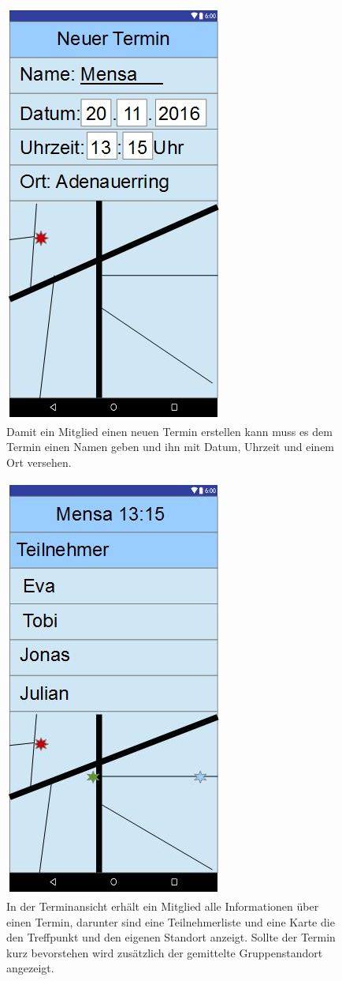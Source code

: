 \documentclass{scrartcl}
\begin{document}
	\newpage
	\begin{figure}[h]
	\centering
	\includegraphics[width=.5\textwidth]{GUI_NeuerTermin.jpg}
	\caption{Damit ein Mitglied einen neuen Termin erstellen kann muss es dem Termin einen Namen geben und ihn mit Datum, Uhrzeit und einem Ort versehen.}
 	\end{figure}

	\newpage
	\begin{figure}[h]
	\centering
	\includegraphics[width=.5\textwidth]{GUI_Termin.jpg}
	\caption{In der Terminansicht erhält ein Mitglied alle Informationen über einen Termin, darunter sind eine Teilnehmerliste und eine Karte die den Treffpunkt und den eigenen Standort anzeigt. Sollte der Termin kurz bevorstehen wird zusätzlich der gemittelte Gruppenstandort angezeigt.}
 	\end{figure}
	
\end{document}
